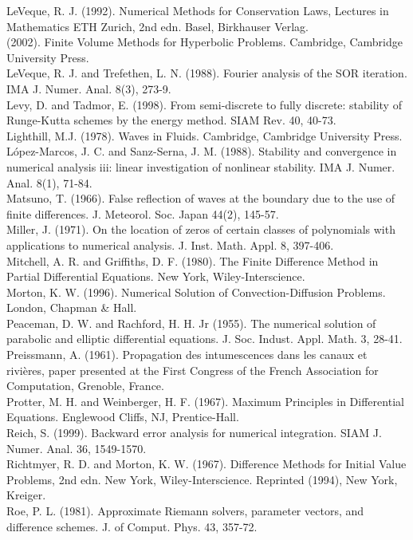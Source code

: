 \documentclass[10pt]{article}
\begin{document}
LeVeque, R. J. (1992). Numerical Methods for Conservation Laws, Lectures in Mathematics ETH Zurich, 2nd edn. Basel, Birkhauser Verlag.\\
(2002). Finite Volume Methods for Hyperbolic Problems. Cambridge, Cambridge University Press.\\
LeVeque, R. J. and Trefethen, L. N. (1988). Fourier analysis of the SOR iteration. IMA J. Numer. Anal. 8(3), 273-9.\\
Levy, D. and Tadmor, E. (1998). From semi-discrete to fully discrete: stability of Runge-Kutta schemes by the energy method. SIAM Rev. 40, 40-73.\\
Lighthill, M.J. (1978). Waves in Fluids. Cambridge, Cambridge University Press.\\
López-Marcos, J. C. and Sanz-Serna, J. M. (1988). Stability and convergence in numerical analysis iii: linear investigation of nonlinear stability. IMA J. Numer. Anal. 8(1), 71-84.\\
Matsuno, T. (1966). False reflection of waves at the boundary due to the use of finite differences. J. Meteorol. Soc. Japan 44(2), 145-57.\\
Miller, J. (1971). On the location of zeros of certain classes of polynomials with applications to numerical analysis. J. Inst. Math. Appl. 8, 397-406.\\
Mitchell, A. R. and Griffiths, D. F. (1980). The Finite Difference Method in Partial Differential Equations. New York, Wiley-Interscience.\\
Morton, K. W. (1996). Numerical Solution of Convection-Diffusion Problems. London, Chapman \& Hall.\\
Peaceman, D. W. and Rachford, H. H. Jr (1955). The numerical solution of parabolic and elliptic differential equations. J. Soc. Indust. Appl. Math. 3, 28-41.\\
Preissmann, A. (1961). Propagation des intumescences dans les canaux et rivières, paper presented at the First Congress of the French Association for Computation, Grenoble, France.\\
Protter, M. H. and Weinberger, H. F. (1967). Maximum Principles in Differential Equations. Englewood Cliffs, NJ, Prentice-Hall.\\
Reich, S. (1999). Backward error analysis for numerical integration. SIAM J. Numer. Anal. 36, 1549-1570.\\
Richtmyer, R. D. and Morton, K. W. (1967). Difference Methods for Initial Value Problems, 2nd edn. New York, Wiley-Interscience. Reprinted (1994), New York, Kreiger.\\
Roe, P. L. (1981). Approximate Riemann solvers, parameter vectors, and difference schemes. J. of Comput. Phys. 43, 357-72.
\end{document}
